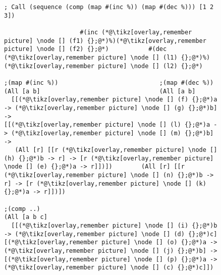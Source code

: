 \documentclass[9pt]{extarticle}
\begin{document}
\begin{figure}
\begin{lstlisting}
; Call (sequence (comp (map #(inc %)) (map #(dec %))) [1 2 3])

                     #(inc (*@\tikz[overlay,remember picture] \node [] (f1) {};@*)%)(*@\tikz[overlay,remember picture] \node [] (f2) {};@*)           #(dec (*@\tikz[overlay,remember picture] \node [] (l1) {};@*)%)(*@\tikz[overlay,remember picture] \node [] (l2) {};@*)

;(map #(inc %))                            ;(map #(dec %))
(All [a b]                                 (All [a b]
  [[(*@\tikz[overlay,remember picture] \node [] (f) {};@*)a -> (*@\tikz[overlay,remember picture] \node [] (g) {};@*)b] ->                                 [[(*@\tikz[overlay,remember picture] \node [] (l) {};@*)a -> (*@\tikz[overlay,remember picture] \node [] (m) {};@*)b] ->
   (All [r] [[r (*@\tikz[overlay,remember picture] \node [] (h) {};@*)b -> r] -> [r (*@\tikz[overlay,remember picture] \node [] (e) {};@*)a -> r]])])        (All [r] [[r (*@\tikz[overlay,remember picture] \node [] (n) {};@*)b -> r] -> [r (*@\tikz[overlay,remember picture] \node [] (k) {};@*)a -> r]])])

;(comp ..)
(All [a b c]
  [[(*@\tikz[overlay,remember picture] \node [] (i) {};@*)b -> (*@\tikz[overlay,remember picture] \node [] (d) {};@*)c] [(*@\tikz[overlay,remember picture] \node [] (o) {};@*)a -> (*@\tikz[overlay,remember picture] \node [] (j) {};@*)b] -> [(*@\tikz[overlay,remember picture] \node [] (p) {};@*)a -> (*@\tikz[overlay,remember picture] \node [] (c) {};@*)c]])


\end{lstlisting}
\end{figure}
\end{document}
